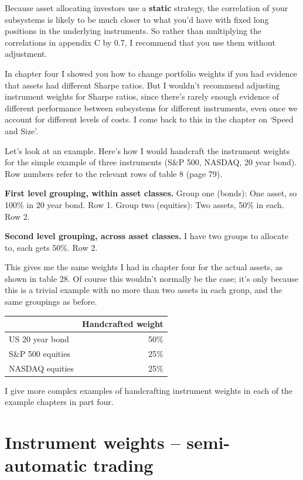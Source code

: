Because asset allocating investors use a \textbf{static} strategy, the correlation of your subsystems is likely to be much closer to what you'd have with fixed long positions in the underlying instruments. So rather than multiplying the correlations in appendix C by 0.7, I recommend that you use them without adjustment.

In chapter four I showed you how to change portfolio weights if you had evidence that assets had different Sharpe ratios. But I wouldn't recommend adjusting instrument weights for Sharpe ratios, since there's rarely enough evidence of different performance between subsystems for different instruments, even once we account for different levels of costs. I come back to this in the chapter on ‘Speed and Size'.

Let's look at an example. Here's how I would handcraft the instrument weights for the simple example of three instruments (S\&P 500, NASDAQ, 20 year bond). Row numbers refer to the relevant rows of table 8 (page 79).

\medskip \noindent\textbf{First level grouping, within asset classes.} Group one (bonds): One asset, so 100\% in 20 year bond. Row 1. Group two (equities): Two assets, 50\% in each. Row 2.

\medskip \noindent\textbf{Second level grouping, across asset classes.} I have two groups to allocate to, each gets 50\%. Row 2.

This gives me the same weights I had in chapter four for the actual assets, as shown in table 28. Of course this wouldn't normally be the case; it's only because this is a trivial example with no more than two assets in each group, and the same groupings as before.

 \begingroup \small \centering \begin{tabular}{@{} lr@{}}
\toprule
& Handcrafted weight \\
\midrule
US 20 year bond & 50\% \\
S\&P 500 equities & 25\% \\
NASDAQ equities & 25\% \\
\bottomrule
\end{tabular}
\par \endgroup

I give more complex examples of handcrafting instrument weights in each of the example chapters in part four.

\section*{Instrument weights -- semi-automatic trading}  {}

